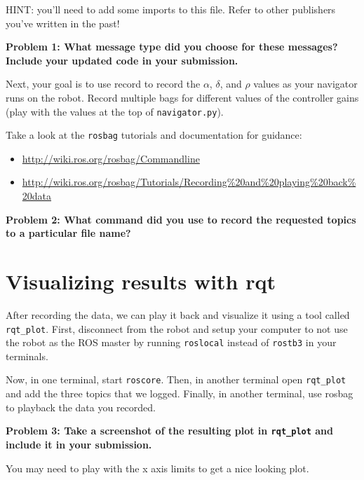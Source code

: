 \documentclass{article}
\begin{document}
HINT: you'll need to add some imports to this file. Refer to other publishers you've written in the past!

\textbf{Problem 1: What message type did you choose for these messages? Include your updated code in your submission.}

Next, your goal is to use record to record the $\alpha$, $\delta$, and $\rho$ values as your navigator runs on the robot. Record multiple bags for different values of the controller gains (play with the values at the top of \texttt{navigator.py}).

Take a look at the 
\texttt{rosbag} tutorials and documentation for guidance:
\begin{itemize}
    \item \url{http://wiki.ros.org/rosbag/Commandline}
    \item \url{http://wiki.ros.org/rosbag/Tutorials/Recording\%20and\%20playing\%20back\%20data}
\end{itemize}


\textbf{Problem 2: What command did you use to record the requested topics to a particular file name?}

\section{Visualizing results with rqt}
After recording the data, we can play it back and visualize it using a tool called \texttt{rqt\_plot}. First, disconnect from the robot and setup your computer to not use the robot as the ROS master by running \texttt{roslocal} instead of \texttt{rostb3} in your terminals.

Now, in one terminal, start \texttt{roscore}. Then, in another terminal open \texttt{rqt\_plot} and add the three topics that we logged. Finally, in another terminal, use rosbag to playback the data you recorded. 

\textbf{Problem 3: Take a screenshot of the resulting plot in \texttt{rqt\_plot} and include it in your submission.}

You may need to play with the x axis limits to get a nice looking plot.
\end{document}
